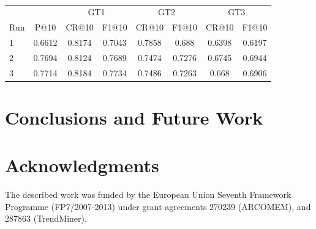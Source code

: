 \documentclass{../acm_proc_article-me11_tweaked}
\begin{document}
\begin{table}[ht]
	\centering
	\caption{\label{tab:crowdResults}}
	\begin{tabular}{|l||c||c|c||c|c||c|c|}
		\hline
		 &  & \multicolumn{2}{c||}{GT1} & \multicolumn{2}{c||}{GT2} & \multicolumn{2}{c|}{GT3} \\
		Run & P@10 & CR@10 & F1@10 & CR@10 & F1@10 & CR@10 & F1@10 \\
		\hline\hline
		1 & 0.6612 & 0.8174 & 0.7043 & 0.7858 & 0.688 & 0.6398 & 0.6197 \\
		\hline
		2 & 0.7694 & 0.8124 & 0.7689 & 0.7474 & 0.7276 & 0.6745 & 0.6944 \\
		\hline
		3 & 0.7714 & 0.8184 & 0.7734 & 0.7486 & 0.7263 & 0.668 & 0.6906 \\
		\hline
	\end{tabular}
\end{table}


\section{Conclusions and Future Work}

\section{Acknowledgments}
The described work was funded by the European Union Seventh Framework Programme (FP7/2007-2013) under grant agreements 270239 (ARCOMEM), and 287863 (TrendMiner).




\end{document}
